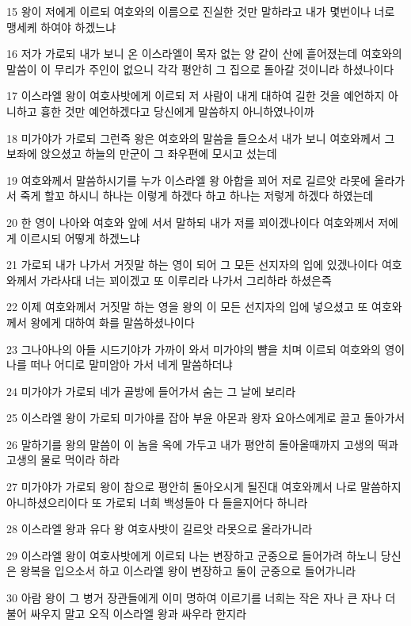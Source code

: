 \par 15 왕이 저에게 이르되 여호와의 이름으로 진실한 것만 말하라고 내가 몇번이나 너로 맹세케 하여야 하겠느냐
\par 16 저가 가로되 내가 보니 온 이스라엘이 목자 없는 양 같이 산에 흩어졌는데 여호와의 말씀이 이 무리가 주인이 없으니 각각 평안히 그 집으로 돌아갈 것이니라 하셨나이다
\par 17 이스라엘 왕이 여호사밧에게 이르되 저 사람이 내게 대하여 길한 것을 예언하지 아니하고 흉한 것만 예언하겠다고 당신에게 말씀하지 아니하였나이까
\par 18 미가야가 가로되 그런즉 왕은 여호와의 말씀을 들으소서 내가 보니 여호와께서 그 보좌에 앉으셨고 하늘의 만군이 그 좌우편에 모시고 섰는데
\par 19 여호와께서 말씀하시기를 누가 이스라엘 왕 아합을 꾀어 저로 길르앗 라못에 올라가서 죽게 할꼬 하시니 하나는 이렇게 하겠다 하고 하나는 저렇게 하겠다 하였는데
\par 20 한 영이 나아와 여호와 앞에 서서 말하되 내가 저를 꾀이겠나이다 여호와께서 저에게 이르시되 어떻게 하겠느냐
\par 21 가로되 내가 나가서 거짓말 하는 영이 되어 그 모든 선지자의 입에 있겠나이다 여호와께서 가라사대 너는 꾀이겠고 또 이루리라 나가서 그리하라 하셨은즉
\par 22 이제 여호와께서 거짓말 하는 영을 왕의 이 모든 선지자의 입에 넣으셨고 또 여호와께서 왕에게 대하여 화를 말씀하셨나이다
\par 23 그나아나의 아들 시드기야가 가까이 와서 미가야의 뺨을 치며 이르되 여호와의 영이 나를 떠나 어디로 말미암아 가서 네게 말씀하더냐
\par 24 미가야가 가로되 네가 골방에 들어가서 숨는 그 날에 보리라
\par 25 이스라엘 왕이 가로되 미가야를 잡아 부윤 아몬과 왕자 요아스에게로 끌고 돌아가서
\par 26 말하기를 왕의 말씀이 이 놈을 옥에 가두고 내가 평안히 돌아올때까지 고생의 떡과 고생의 물로 먹이라 하라
\par 27 미가야가 가로되 왕이 참으로 평안히 돌아오시게 될진대 여호와께서 나로 말씀하지 아니하셨으리이다 또 가로되 너희 백성들아 다 들을지어다 하니라
\par 28 이스라엘 왕과 유다 왕 여호사밧이 길르앗 라못으로 올라가니라
\par 29 이스라엘 왕이 여호사밧에게 이르되 나는 변장하고 군중으로 들어가려 하노니 당신은 왕복을 입으소서 하고 이스라엘 왕이 변장하고 둘이 군중으로 들어가니라
\par 30 아람 왕이 그 병거 장관들에게 이미 명하여 이르기를 너희는 작은 자나 큰 자나 더불어 싸우지 말고 오직 이스라엘 왕과 싸우라 한지라
